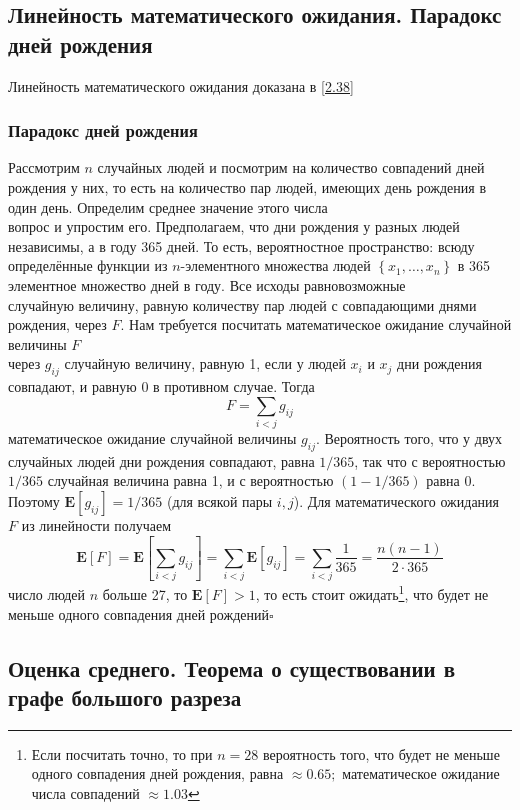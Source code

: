 \documentclass[a4paper]{article}
\newcommand{\qed}{\hfill$\square$}
\begin{document}
\subsection{Линейность математического ожидания. Парадокс дней рождения}
Линейность математического ожидания доказана в \ref{2.38}
\subsubsection*{Парадокс дней рождения}
Рассмотрим $n$ случайных людей и посмотрим на количество совпадений дней рождения у них, то есть на количество пар людей, имеющих день рождения в один день. Определим среднее значение этого числа\\[2mm]
 вопрос и упростим его. Предполагаем, что дни рождения у разных людей независимы, а в году 365 дней. То есть, вероятностное пространство: всюду определённые функции из $n$-элементного множества людей $\left\{x_{1}, \ldots, x_{n}\right\}$ в 365 элементное множество дней в году. Все исходы равновозможные\\[2mm]
 случайную величину, равную количеству пар людей с совпадающими днями рождения, через $F$. Нам требуется посчитать математическое ожидание случайной величины $F$\\[2mm]
 через $g_{i j}$ случайную величину, равную 1, если у людей $x_{i}$ и $x_{j}$ дни рождения совпадают, и равную 0 в противном случае. Тогда
$$
F=\sum_{i<j} g_{i j}
$$
 математическое ожидание случайной величины $g_{i j}$. Вероятность того, что у двух случайных людей дни рождения совпадают, равна $1 / 365$, так что с вероятностью $1 / 365$ случайная величина равна 1, и с вероятностью 
$(1-1 / 365)$ равна 0. Поэтому $\mathbf{E}\left[g_{i j}\right]=1 / 365$ (для всякой пары $i, j$). Для математического ожидания $F$ из линейности получаем
$$
\mathbf{E}[F]=\mathbf{E}\left[\sum_{i<j} g_{i j}\right]=\sum_{i<j} \mathbf{E}\left[g_{i j}\right]=\sum_{i<j} \frac{1}{365}=\frac{n(n-1)}{2 \cdot 365}
$$
 число людей $n$ больше 27, то $\mathbf{E}[F]>1$, то есть стоит ожидать\footnote{Если посчитать точно, то при $n=28$ вероятность того, что будет не меньше одного совпадения дней рождения, равна $\approx 0.65 ;$ математическое ожидание числа совпадений $\approx 1.03$}, что будет не меньше одного совпадения дней рождений\qed

\subsection{Оценка среднего. Теорема о существовании в графе большого разреза}
\end{document}
